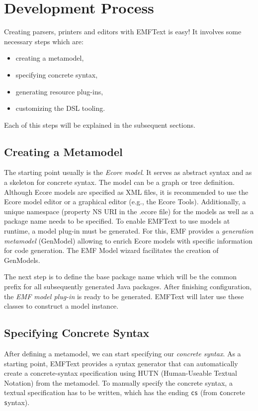 \chapter{Development Process}

Creating parsers, printers and editors with EMFText is easy! It involves some
necessary steps which are:
\begin{itemize}
  \item creating a metamodel,
  \item specifying concrete syntax,
  \item generating resource plug-ins,
  \item customizing the DSL tooling.
\end{itemize}

Each of this steps will be explained in the subsequent sections.

\section{Creating a Metamodel}

The starting point usually is the \emph{Ecore model}. It serves as 
abstract syntax and as a skeleton for concrete syntax. The model can be a graph or tree 
definition. Although Ecore models are specified as XML files, it is recommended 
to use the Ecore model editor or a graphical editor (e.g., the Ecore Tools).
Additionally, a unique namespace (property NS URI in the .ecore file) for the models as well as a package 
name needs to be specified. To enable EMFText to use models at runtime, a model 
plug-in must be generated. For this, EMF provides a \emph{generation
metamodel} (GenModel) allowing to enrich Ecore models with specific information
for code generation. The EMF Model wizard facilitates the creation of GenModels.

The next step is to define the base package name which will be the common prefix 
for all subsequently generated Java packages. After finishing configuration, the 
\emph{EMF model plug-in} is ready to be generated. EMFText will later use
these classes to construct a model instance.

\section{Specifying Concrete Syntax}

After defining a metamodel, we can start specifying our
\emph{concrete syntax}. As a starting point, EMFText provides a syntax generator that can
automatically create a concrete-syntax specification using HUTN (Human-Useable Textual Notation) from the 
metamodel. To manually specify the concrete syntax, a textual specification has to 
be written, which has the ending \texttt{cs} (from \texttt{c}oncrete
\texttt{s}yntax). 

